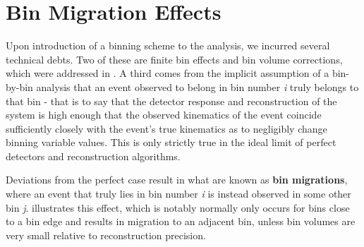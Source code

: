 \section{Bin Migration Effects}

Upon introduction of a binning scheme to the analysis, we incurred several technical debts. Two of these are finite bin effects and bin volume corrections, which were addressed in . A third comes from the implicit assumption of a bin-by-bin analysis that an event observed to belong in bin number \textit{i} truly belongs to that bin - that is to say that the detector response and reconstruction of the system is high enough that the observed kinematics of the event coincide sufficiently closely with the event's true kinematics as to negligibly change binning variable values. This is only strictly true in the ideal limit of perfect detectors and reconstruction algorithms.

Deviations from the perfect case result in what are known as \textbf{bin migrations}, where an event that truly lies in bin number \textit{i} is instead observed in some other bin \textit{j}.  illustrates this effect, which is notably normally only occurs for bins close to a bin edge and results in migration to an adjacent bin, unless bin volumes are very small relative to reconstruction precision.  

